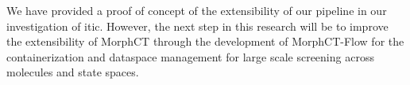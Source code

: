 We have provided a proof of concept of the extensibility of our pipeline
in our investigation of \gls{itic}. However, the next step in this research
will be to improve the extensibility of \gls{MorphCT} through the development
of \gls{MorphCT-Flow} for the containerization and dataspace management for
large scale screening across molecules and state spaces. 











